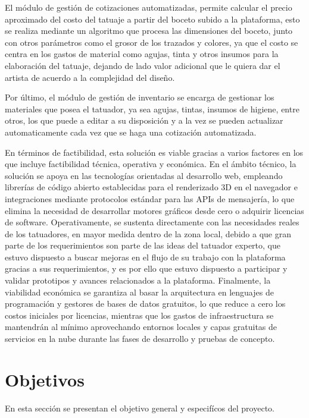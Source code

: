 El módulo de gestión de cotizaciones automatizadas, permite calcular el precio aproximado del costo del tatuaje a partir del boceto subido a la plataforma, esto se realiza mediante un algoritmo que procesa las dimensiones del boceto, junto con otros parámetros como el grosor de los trazados y colores, ya que el costo se centra en los gastos de material como agujas, tinta y otros insumos para la elaboración del tatuaje, dejando de lado valor adicional que le quiera dar el artista de acuerdo a la complejidad del diseño.

Por último, el módulo de gestión de inventario se encarga de gestionar los materiales que posea el tatuador, ya sea agujas, tintas, insumos de higiene, entre otros, los que puede a editar a su disposición y a la vez se pueden actualizar automaticamente cada vez que se haga una cotización automatizada.

En términos de factibilidad, esta solución es viable gracias a varios factores en los que incluye factibilidad técnica, operativa y económica. En el ámbito técnico, la solución se apoya en las tecnologías orientadas al desarrollo web, empleando librerías de código abierto establecidas para el renderizado 3D en el navegador e integraciones mediante protocolos estándar para las APIs de mensajería, lo que elimina la necesidad de desarrollar motores gráficos desde cero o adquirir licencias de software. Operativamente, se sustenta directamente con las necesidades reales de los tatuadores, en mayor medida dentro de la zona local, debido a que gran parte de los requerimientos son parte de las ideas del tatuador experto, que estuvo dispuesto a buscar mejoras en el flujo de su trabajo con la plataforma gracias a sus requerimientos, y es por ello que estuvo dispuesto a participar y validar prototipos y avances relacionados a la plataforma. Finalmente, la viabilidad económica se garantiza al basar la arquitectura en lenguajes de programación y gestores de bases de datos gratuitos, lo que reduce a cero los costos iniciales por licencias, mientras que los gastos de infraestructura se mantendrán al mínimo aprovechando entornos locales y capas gratuitas de servicios en la nube durante las fases de desarrollo y pruebas de concepto.

\section{Objetivos}

En esta sección se presentan el objetivo general y especifícos del proyecto.


